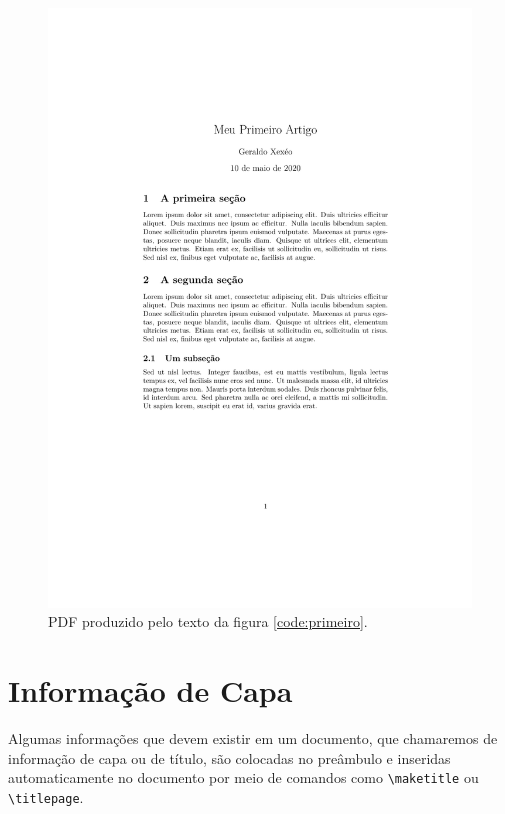 \begin{figure}
    \centering
    \includegraphics[height=.8\textheight,frame]{primeiroartigo}
    \caption{PDF produzido pelo texto da figura \ref{code:primeiro}.}
    \label{fig:primeiroartigo}
\end{figure}


\section{Informação de Capa}

Algumas informações que devem existir em um documento, que chamaremos de informação de capa ou de título, são colocadas no preâmbulo e inseridas automaticamente no documento por meio de comandos como 
\lstinline|\maketitle| ou \lstinline|\titlepage|.

